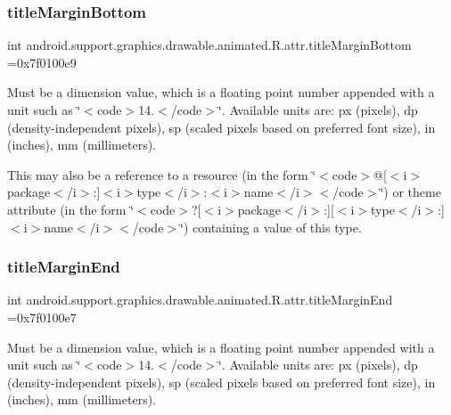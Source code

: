 \subsubsection{\texorpdfstring{title\+Margin\+Bottom}{titleMarginBottom}}
{\footnotesize\ttfamily int android.\+support.\+graphics.\+drawable.\+animated.\+R.\+attr.\+title\+Margin\+Bottom =0x7f0100e9\hspace{0.3cm}{\ttfamily [static]}}

Must be a dimension value, which is a floating point number appended with a unit such as \char`\"{}$<$code$>$14.\+5sp$<$/code$>$\char`\"{}. Available units are\+: px (pixels), dp (density-\/independent pixels), sp (scaled pixels based on preferred font size), in (inches), mm (millimeters). 

This may also be a reference to a resource (in the form \char`\"{}$<$code$>$@\mbox{[}$<$i$>$package$<$/i$>$\+:\mbox{]}$<$i$>$type$<$/i$>$\+:$<$i$>$name$<$/i$>$$<$/code$>$\char`\"{}) or theme attribute (in the form \char`\"{}$<$code$>$?\mbox{[}$<$i$>$package$<$/i$>$\+:\mbox{]}\mbox{[}$<$i$>$type$<$/i$>$\+:\mbox{]}$<$i$>$name$<$/i$>$$<$/code$>$\char`\"{}) containing a value of this type. \mbox{\label{classandroid_1_1support_1_1graphics_1_1drawable_1_1animated_1_1R_1_1attr_ad9b548547dd2cb0ea512931e325084be}} 
\subsubsection{\texorpdfstring{title\+Margin\+End}{titleMarginEnd}}
{\footnotesize\ttfamily int android.\+support.\+graphics.\+drawable.\+animated.\+R.\+attr.\+title\+Margin\+End =0x7f0100e7\hspace{0.3cm}{\ttfamily [static]}}

Must be a dimension value, which is a floating point number appended with a unit such as \char`\"{}$<$code$>$14.\+5sp$<$/code$>$\char`\"{}. Available units are\+: px (pixels), dp (density-\/independent pixels), sp (scaled pixels based on preferred font size), in (inches), mm (millimeters). 

